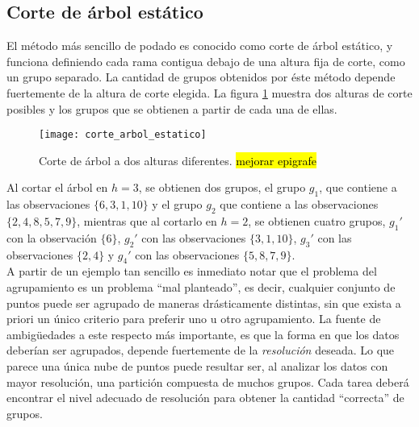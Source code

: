 \subsection{Corte de árbol estático}
El método más sencillo de podado es conocido como corte de árbol estático, y funciona definiendo cada rama contigua debajo de una altura fija de corte, como un grupo separado. La cantidad de grupos obtenidos por éste método depende fuertemente de la altura de  corte elegida. La figura \ref{fig:corte_arbol_estatico} muestra dos alturas de corte posibles y los grupos que se obtienen a partir de cada una de ellas.
\begin{figure}[h]
    \centering
    \texttt{[image: corte\_arbol\_estatico]}
    \caption{Corte de árbol a dos alturas diferentes. \hl{mejorar epigrafe}}
    \label{fig:corte_arbol_estatico}
\end{figure}
Al cortar el árbol en $h=3$, se obtienen dos grupos, el grupo $g_1$, que contiene a las observaciones $\{6, 3, 1, 10\}$ y el grupo $g_2$ que contiene a las observaciones $\{2, 4, 8, 5, 7, 9\}$, mientras que al cortarlo en $h=2$, se obtienen cuatro grupos, $g_1'$ con la observación $\{6\}$, $g_2'$ con las observaciones $\{3, 1, 10\}$, $g_3'$ con las observaciones $\{2, 4\}$ y $g_4'$ con las observaciones $\{5, 8, 7, 9\}$.\\
A partir de un ejemplo tan sencillo es inmediato notar que el problema del agrupamiento es un problema ``mal planteado'', es decir, cualquier conjunto de puntos puede ser agrupado de maneras drásticamente distintas, sin que exista a priori un único criterio para preferir uno u otro agrupamiento. La fuente de ambigüedades a este respecto más importante, es que la forma en que los datos deberían ser agrupados, depende fuertemente de la \textit{resolución} deseada. Lo que parece una única nube de puntos puede resultar ser, al analizar los datos con mayor resolución, una partición compuesta de muchos grupos. Cada tarea deberá encontrar el nivel adecuado de resolución para obtener la cantidad ``correcta'' de grupos.\cite{Domany1999}\cite{Langfelder2008}
